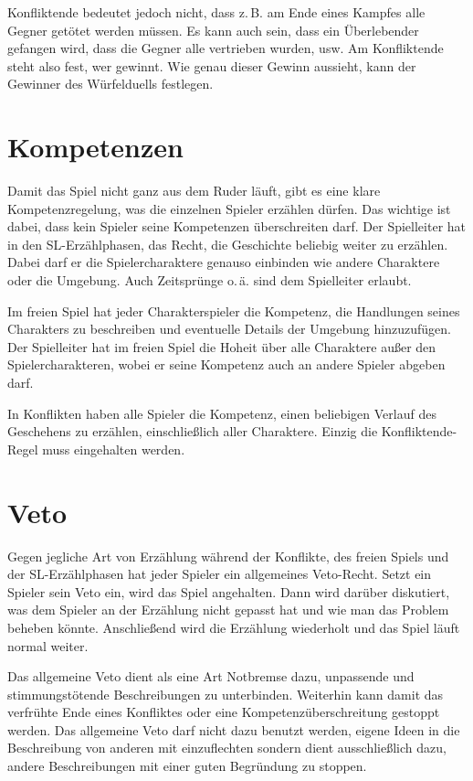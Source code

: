 Konfliktende bedeutet jedoch nicht, dass z.\,B. am Ende eines Kampfes alle Gegner getötet werden müssen. Es kann auch sein, dass ein Überlebender gefangen wird, dass die Gegner alle vertrieben wurden, usw. Am Konfliktende steht also fest, wer gewinnt. Wie genau dieser Gewinn aussieht, kann der Gewinner des Würfelduells festlegen.

\section{Kompetenzen}
Damit das Spiel nicht ganz aus dem Ruder läuft, gibt es eine klare Kompetenzregelung, was die einzelnen Spieler erzählen dürfen. Das wichtige ist dabei, dass kein Spieler seine Kompetenzen überschreiten darf. Der Spielleiter hat in den SL-Erzählphasen, das Recht, die Geschichte beliebig weiter zu erzählen. Dabei darf er die Spielercharaktere genauso einbinden wie andere Charaktere oder die Umgebung. Auch Zeitsprünge o.\,ä. sind dem Spielleiter erlaubt.

Im freien Spiel hat jeder Charakterspieler die Kompetenz, die Handlungen seines Charakters zu beschreiben und eventuelle Details der Umgebung hinzuzufügen. Der Spielleiter hat im freien Spiel die Hoheit über alle Charaktere außer den Spielercharakteren, wobei er seine Kompetenz auch an andere Spieler abgeben darf.

In Konflikten haben alle Spieler die Kompetenz, einen beliebigen Verlauf des Geschehens zu erzählen, einschließlich aller Charaktere. Einzig die Konfliktende-Regel muss eingehalten werden.

\section{Veto}
Gegen jegliche Art von Erzählung während der Konflikte, des freien Spiels und der SL-Erzählphasen hat jeder Spieler ein allgemeines Veto-Recht. Setzt ein Spieler sein Veto ein, wird das Spiel angehalten. Dann wird darüber diskutiert, was dem Spieler an der Erzählung nicht gepasst hat und wie man das Problem beheben könnte. Anschließend wird die Erzählung wiederholt und das Spiel läuft normal weiter.

Das allgemeine Veto dient als eine Art Notbremse dazu, unpassende und stimmungstötende Beschreibungen zu unterbinden. Weiterhin kann damit das verfrühte Ende eines Konfliktes oder eine Kompetenzüberschreitung gestoppt werden. Das allgemeine Veto darf nicht dazu benutzt werden, eigene Ideen in die Beschreibung von anderen mit einzuflechten sondern dient ausschließlich dazu, andere Beschreibungen mit einer guten Begründung zu stoppen. 


